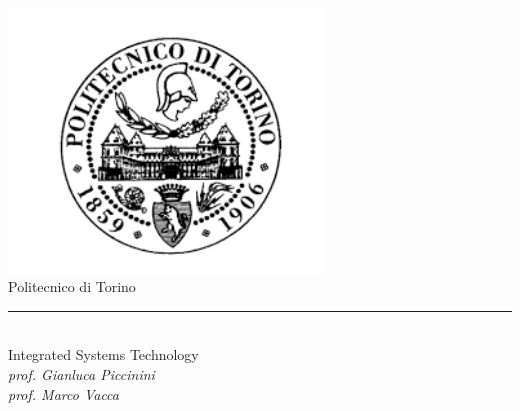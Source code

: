 \begin{titlepage}
	
	\newcommand{\HRule}{\rule{\linewidth}{0.5mm}} %
	
	\center %
	
	
	\includegraphics[height=7cm]{immagini/polito.png}\\[0.5cm] %
	
	
	{\LARGE Politecnico di Torino}\\[0.8cm] %
	\HRule \\[1cm]

	{\huge\LARGE Integrated Systems Technology}\\[0.5cm] %
	\emph{{prof. Gianluca Piccinini}}\\
	\emph{{prof. Marco Vacca}}\\[0.5cm] %
	
	
	

\end{titlepage}
